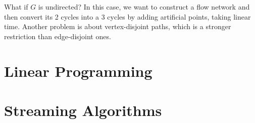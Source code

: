 \documentclass{article}
\begin{document}
    What if $G$ is undirected? In this case, we want to construct a flow network and then convert its 2 cycles into a 3 cycles by adding artificial points, taking linear time. Another problem is about vertex-disjoint paths, which is a stronger restriction than edge-disjoint ones.

\section{Linear Programming}

\section{Streaming Algorithms}

  \begin{algo}
    
    \begin{algorithm}[H]
      \caption{}
      \label{alg:majority_vote}
      \begin{algorithmic}
        \Require{}
        \State 
        \EndFunction
      \end{algorithmic}
    \end{algorithm}
  \end{algo}

  \begin{algo}
    
    \begin{algorithm}[H]
      \caption{}
      \label{alg:median_track}
      \begin{algorithmic}
        \Require{}
        \State 
        \EndFunction
      \end{algorithmic}
    \end{algorithm}
  \end{algo}
\end{document}
